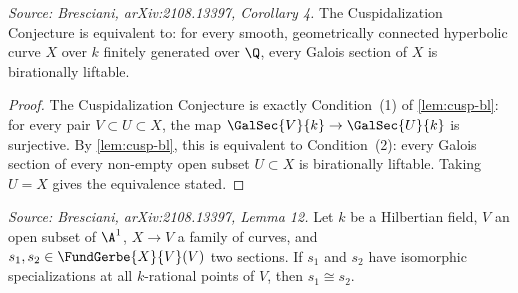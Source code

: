 \begin{corollary}[CuspBL2]
  \label{cor:cusp-bl2}
  \textit{Source: Bresciani, arXiv:2108.13397, Corollary 4.}
  The Cuspidalization Conjecture is equivalent to: for every smooth, geometrically
  connected hyperbolic curve \(X\) over \(k\) finitely generated over \(\Q\), every
  Galois section of \(X\) is birationally liftable.
\end{corollary}

\begin{proof}
  The Cuspidalization Conjecture is exactly Condition~(1) of \cref{lem:cusp-bl}:
  for every pair \(V \subset U \subset X\), the map \(\GalSec{V}{k} \to \GalSec{U}{k}\)
  is surjective. By \cref{lem:cusp-bl}, this is equivalent to Condition~(2): every
  Galois section of every non-empty open subset \(U \subset X\) is birationally
  liftable. Taking \(U = X\) gives the equivalence stated.
\end{proof}

\begin{lemma}[HilbertSections]
  \label{lem:hilbert-sections}
  \textit{Source: Bresciani, arXiv:2108.13397, Lemma 12.}
  Let \(k\) be a Hilbertian field, \(V\) an open subset of \(\A^1\),
  \(X \to V\) a family of curves, and \(s_1, s_2 \in \FundGerbe{X}{V}(V)\) two
  sections. If \(s_1\) and \(s_2\) have isomorphic specializations at all \(k\)-rational
  points of \(V\), then \(s_1 \cong s_2\).
\end{lemma}


